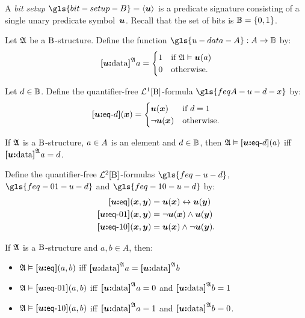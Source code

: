 A \emph{bit setup} $\gls{bit-setup-B} = \seq{\su}$ is a predicate signature
consisting of a single unary predicate symbol~$\su$.
Recall that the set of bits is $\Bits=\set{0,1}$.

\begin{definition}
Let $\StrA$ be a $\BS$-structure.
Define the function $\gls{u-data-A} : \domA \to \Bits$ by:
\[
  \data\su\StrA a = \begin{cases}
    1 &\text{if } \StrA \vDash \su(a) \\
    0 &\text{otherwise.}
  \end{cases}
\]
\end{definition}
\begin{definition}
Let $\datad \in \Bits$. Define the quantifier-free $\vFoF1\BS$-formula
$\gls{feqA-u-d-x}$ by:
\[
  \feqA\su\datad(\xx) = \begin{cases}
    \su(\xx) &\text{if } \datad = 1 \\
    \lnot\su(\xx) &\text{otherwise.}
  \end{cases}
\]
\end{definition}

\begin{remark}
If $\StrA$ is a $\BS$-structure, $\ea\in\domA$ is an element and $\datad \in
\Bits$, then $\StrA \vDash \feqA\su\datad(\ea)$ iff $\data\su\StrA\ea = \datad$.
\end{remark}

\begin{definition}
Define the quantifier-free $\vFoF2\BS$-formulas 
$\gls{feq-u-d}$, $\gls{feq-01-u-d}$ and $\gls{feq-10-u-d}$ by:
\begin{align*}
  \feq\su(\xx,\yy) &= \su(\xx) \lequ \su(\yy) \\
  \feqOI\su(\xx,\yy) &= \lnot \su(\xx) \land \su(\yy) \\
  \feqIO\su(\xx,\yy) &= \su(\xx) \land \lnot \su(\yy). \\
\end{align*}
\end{definition}

\begin{remark}
If $\StrA$ is a $\BS$-structure and $a, b \in A$, then:
\begin{itemize}
  \item $\StrA \vDash \feq\su(a, b)$ iff $\data\su\StrA a = \data\su\StrA b$
  \item $\StrA \vDash \feqOI\su(a, b)$ iff $\data\su\StrA a = 0$ and
  $\data\su\StrA b = 1$
  \item $\StrA \vDash \feqIO\su(a, b)$ iff $\data\su\StrA a = 1$ and
  $\data\su\StrA b = 0$.
\end{itemize}
\end{remark}